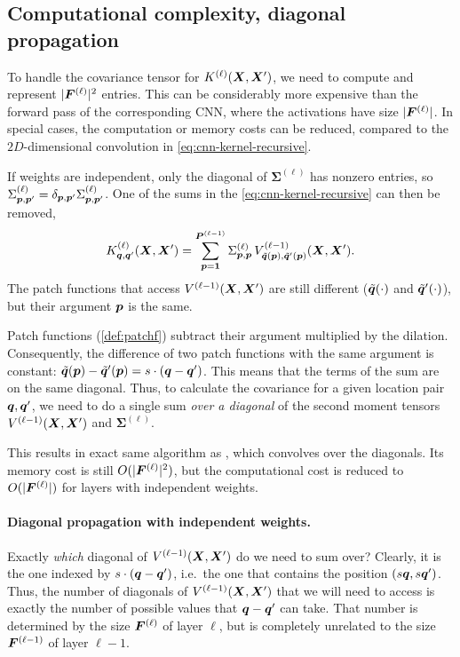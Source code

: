 \documentclass[accepted]{uai2021} %
\newcommand{\layersizebase}{\vF}
\newcommand{\layersize}[1]{{\layersizebase^{\bra{#1}}}}
\newcommand{\patchsizebase}{\vP}
\newcommand{\patchsize}[1]{{\patchsizebase^{\bra{#1}}}}
\newcommand{\patchf}[2]{{\tilde#1\bra{#2}}}
\newcommand{\priorWcovs}[1]{\Sigma^{(#1)}}
\newcommand{\priorWcov}[1]{\boldsymbol{\Sigma}^{(#1)}}
\newcommand{\patch}{\vp}               %
\newcommand{\nextpatch}{\vq}
\newcommand{\covf}[1]{K\ssup{#1}}
\newcommand{\nlinf}[1]{V\ssup{#1}}
\newcommand{\0}{\boldsymbol{0}}
\newcommand{\1}{\boldsymbol{1}}
\newcommand{\crefp}[1]{(\cref{#1})}
\begin{document}
\subsection{Computational complexity, diagonal propagation}
To handle the covariance tensor for $\covf{\ell}\bra{\mX,\mX'}$, we need to compute and represent $\absshort{\layersize{\ell}}^{2}$ entries. This can be considerably more expensive than the forward pass of the corresponding CNN, where the activations have size $\absshort{\layersize{\ell}}$.
In special cases, the computation or memory costs can be reduced, compared to the $2D$-dimensional convolution in \cref{eq:cnn-kernel-recursive}.

If weights are independent, only the diagonal of $\priorWcov{\ell}$ has nonzero entries, so $\priorWcovs{\ell}_{\patch,\patch'} = \delta_{\patch,\patch'}\priorWcovs{\ell}_{\patch,\patch'}$. One of the sums in the \cref{eq:cnn-kernel-recursive} can then be removed,
\begin{equation}
\covf{\ell}_{\nextpatch,\nextpatch'}\bra{\mX, \mX'} =
\sum_{\patch=\1}^{\patchsize{\ell-1}}
\priorWcovs{\ell}_{\patch,\patch} \,
\nlinf{\ell-1}_{\patchf{\nextpatch}{\patch},\patchf{\nextpatch'}{\patch}}\bra{\mX, \mX'}.
\label{eq:cnn-kernel-independent-weights}
\end{equation}
The patch functions that access $\nlinf{\ell-1}\bra{\mX,\mX'}$ are still
different ($\patchf{\nextpatch}{\cdot}$ and $\patchf{\nextpatch'}{\cdot}$), but
their argument $\patch$ is the same.

Patch functions \crefp{def:patchf} subtract their argument multiplied by the dilation. Consequently, the difference  of two patch functions with the same argument is constant: $\patchf{\nextpatch}{\patch} - \patchf{\nextpatch'}{\patch} = s\cdot\bra{\nextpatch - \nextpatch'}$. This means that the terms of the sum are on the same diagonal. Thus, to calculate the covariance for a given location pair $\nextpatch,\nextpatch'$, we need to do a single sum \emph{over a diagonal} of the second moment tensors $\nlinf{\ell-1}\bra{\mX, \mX'}$ and $\priorWcov{\ell}.$

This results in exact same algorithm as \citet{arora2019exact}, which convolves over the diagonals. Its memory cost is still $O(\absshort{\layersize{\ell}}^{2})$, but the computational cost is reduced to $O(\absshort{\layersize{\ell}})$ for layers with independent weights.

\paragraph{Diagonal propagation with independent weights.}
Exactly \emph{which} diagonal of $\nlinf{\ell-1}\bra{\mX, \mX'}$ do we need to sum over? Clearly, it is the one indexed by $s\cdot\bra{\nextpatch - \nextpatch'}$, i.e.~the one that contains the position $\bra{s\nextpatch, s\nextpatch'}$. Thus, the number of diagonals of $\nlinf{\ell-1}\bra{\mX, \mX'}$ that we will need to access is exactly the number of possible values that $\nextpatch-\nextpatch'$ can take. That number is determined by the size $\layersize{\ell}$ of layer $\ell$, but is completely unrelated to the size $\layersize{\ell-1}$ of layer $\ell-1$.
\end{document}
